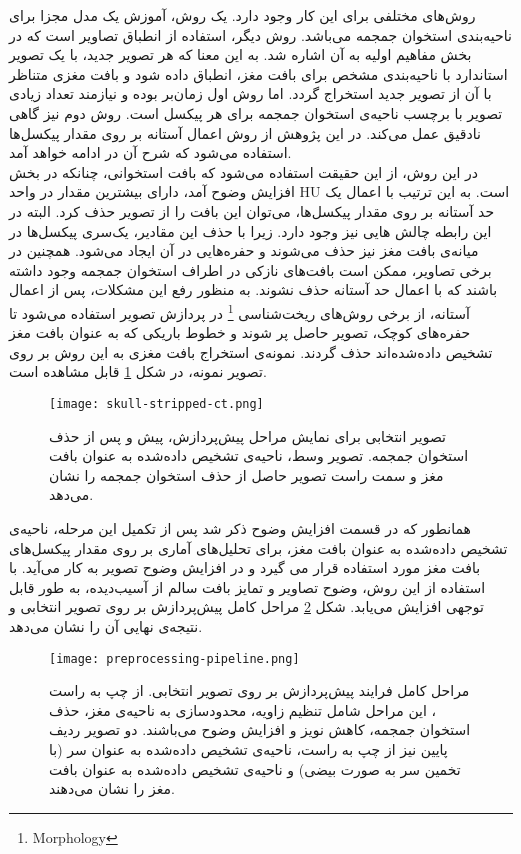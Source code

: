 روش‌های مختلفی برای این کار وجود دارد.
یک روش، آموزش یک مدل مجزا برای ناحیه‌بندی استخوان جمجمه می‌باشد.
روش دیگر، استفاده از انطباق تصاویر است که در بخش مفاهیم اولیه به آن اشاره شد.
به این معنا که هر تصویر جدید، با یک تصویر استاندارد با ناحیه‌بندی مشخص برای بافت مغز، انطباق داده شود و بافت مغزی متناظر با آن از تصویر جدید استخراج گردد.
اما روش اول زمان‌بر بوده و نیازمند تعداد زیادی تصویر با برچسب ناحیه‌ی استخوان جمجمه برای هر پیکسل است.
روش دوم نیز گاهی نادقیق عمل می‌کند.
در این پژوهش از روش اعمال آستانه بر روی مقدار پیکسل‌ها استفاده می‌شود که شرح آن در ادامه خواهد آمد.\\

در این روش، از این حقیقت استفاده می‌شود که بافت استخوانی، چنانکه در بخش افزایش وضوح آمد، دارای بیشترین مقدار در واحد HU است.
به این ترتیب با اعمال یک حد آستانه بر روی مقدار پیکسل‌ها، می‌‌توان این بافت را از تصویر حذف کرد.
البته در این رابطه چالش هایی نیز وجود دارد.
زیرا با حذف این مقادیر، یک‌سری پیکسل‌ها در میانه‌ی بافت مغز نیز حذف می‌شوند و حفره‌هایی در آن ایجاد می‌شود.
همچنین در برخی تصاویر، ممکن است بافت‌های نازکی در اطراف استخوان جمجمه وجود داشته باشند که با اعمال حد آستانه حذف نشوند.
به منظور رفع این مشکلات، پس از اعمال آستانه، از برخی روش‌های ریخت‌شناسی
\footnote{Morphology}
در پردازش تصویر استفاده می‌شود تا
حفره‌های کوچک، تصویر حاصل پر شوند و 
خطوط باریکی که به عنوان بافت مغز تشخیص داده‌شده‌اند حذف گردند.
نمونه‌ی استخراج بافت مغزی به این روش بر روی تصویر نمونه، در شکل \ref{fig:skull-stripped-ct}
قابل مشاهده است.

\begin{figure}[ht]
\centering
\texttt{[image: skull-stripped-ct.png]}
\caption[]{تصویر انتخابی برای نمایش مراحل پیش‌پردازش، پیش و پس از حذف استخوان جمجمه. تصویر وسط، ناحیه‌ی تشخیص داده‌شده به عنوان بافت مغز و سمت راست تصویر حاصل از حذف استخوان جمجمه را نشان می‌دهد.}
\label{fig:skull-stripped-ct}
\end{figure}

همانطور که در قسمت افزایش وضوح ذکر شد پس از تکمیل این مرحله، ناحیه‌ی تشخیص داده‌شده به عنوان بافت مغز، برای تحلیل‌های آماری بر روی مقدار پیکسل‌های بافت مغز مورد استفاده قرار می گیرد و در افزایش وضوح تصویر به کار می‌آید.
با استفاده از این روش، وضوح تصاویر و تمایز بافت سالم از آسیب‌دیده، به طور قابل توجهی افزایش می‌یابد.
شکل \ref{fig:preprocessing-pipeline}
مراحل کامل پیش‌پردازش بر روی تصویر انتخابی و نتیجه‌ی نهایی آن را نشان می‌دهد.

\begin{figure}[ht]
\centering
\texttt{[image: preprocessing-pipeline.png]}
\caption[]{مراحل کامل فرایند پیش‌پردازش بر روی تصویر انتخابی. از چپ به راست ، این مراحل شامل تنظیم زاویه، محدودسازی به ناحیه‌ی مغز، حذف استخوان جمجمه، کاهش نویز و افزایش وضوح می‌باشند. دو تصویر ردیف پایین نیز از چپ به راست، ناحیه‌ی تشخیص داده‌شده به عنوان سر (با تخمین سر به صورت بیضی) و ناحیه‌ی تشخیص داده‌شده به عنوان بافت مغز را نشان می‌دهند.}
\label{fig:preprocessing-pipeline}
\end{figure}

